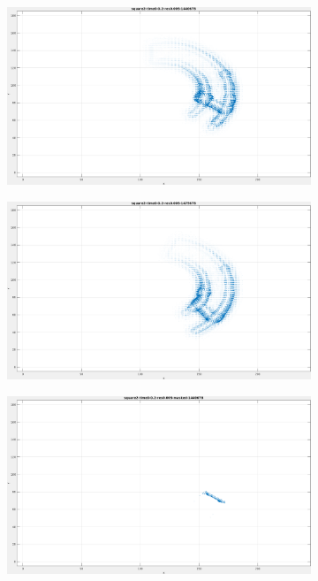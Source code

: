 \begin{appendix}
	\begin{figure}[tb]
\centering
\begin{subfigure}{.45\textwidth}
  \centering
  \includegraphics[height=.6\linewidth]{figs/square2/square2-1.png}
  \caption{}
\end{subfigure}
\begin{subfigure}{.45\textwidth}
  \centering
  \includegraphics[height=.6\linewidth]{figs/square2/square2-2.png}
  \caption{}
\end{subfigure}
\begin{subfigure}{.45\textwidth}
  \includegraphics[height=.6\linewidth]{figs/square2/square2-masked-1.png}

\end{subfigure}
\end{figure}
\end{appendix}
